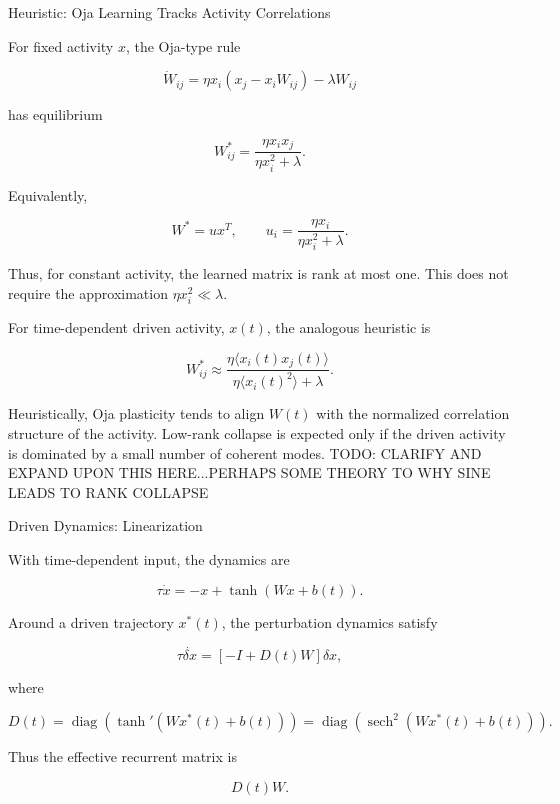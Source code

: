 \documentclass[
11pt,notheorems,hyperref={pdfauthor=whatever}
]{beamer}
\begin{document}
\begin{frame}{Heuristic: Oja Learning Tracks Activity Correlations}
\small

For fixed activity \(x\), the Oja-type rule

\[
\dot W_{ij}
=
\eta x_i(x_j-x_iW_{ij})-\lambda W_{ij}
\]

has equilibrium

\[
W_{ij}^{\ast}
=
\frac{\eta x_i x_j}{\eta x_i^2+\lambda}.
\]

Equivalently,

\[
W^\ast = u x^T,
\qquad
u_i=
\frac{\eta x_i}{\eta x_i^2+\lambda}.
\]

Thus, for constant activity, the learned matrix is rank at most one. This
does not require the approximation
\(\eta x_i^2 \ll \lambda\).

\vspace{0.5em}

For time-dependent driven activity, \(x(t)\), the analogous heuristic is

\[
W_{ij}^{\ast}
\approx
\frac{\eta \langle x_i(t)x_j(t)\rangle}
{\eta \langle x_i(t)^2\rangle+\lambda}.
\]

Heuristically, Oja plasticity tends to align \(W(t)\) with the normalized correlation
structure of the activity. Low-rank collapse is expected only if the driven
activity is dominated by a small number of coherent modes. TODO: CLARIFY AND EXPAND UPON THIS HERE...PERHAPS SOME THEORY TO WHY SINE LEADS TO RANK COLLAPSE

\end{frame}

\begin{frame}{Driven Dynamics: Linearization}
\small

With time-dependent input, the dynamics are

\[
\tau \dot{x}
=
-x+\tanh(Wx+b(t)).
\]

Around a driven trajectory \(x^\ast(t)\), the perturbation dynamics satisfy

\[
\tau \dot{\delta x}
=
\left[-I+D(t)W\right]\delta x,
\]

where

\[
D(t)
=
\operatorname{diag}\left(
\tanh'(Wx^\ast(t)+b(t))
\right)
=
\operatorname{diag}\left(
\operatorname{sech}^2(Wx^\ast(t)+b(t))
\right).
\]

Thus the effective recurrent matrix is

\[
D(t)W.
\]

\end{frame}
\end{document}
